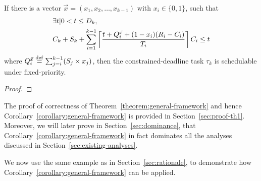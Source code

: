  \begin{Corollary}
   \label{corollary:general-framework}
   If there is a vector $\vec{x} = (x_1, x_2, \ldots,
   x_{k-1})$ with $x_i \in \{ 0, 1\}$, such that 
   {\small \begin{align} 
   \label{eq:TDA-suspension-tighter} 
       & \exists t | 0 < t \leq D_k,  \nonumber \\
       & C_k + S_k + \sum_{i=1}^{k-1}\ceiling{\frac{t+Q_i^{\vec{x}}+(1-x_i)(R_i-C_i)}{T_i}} C_i \leq t
     \end{align}}
     where $Q_i^{\vec{x}} \stackrel{\mathrm{def}}{=} \sum_{j=i}^{k-1} (S_j \times x_j)$, then the constrained-deadline task $\tau_k$ is schedulable under fixed-priority.
 \end{Corollary}
 \begin{proof}
 \end{proof}
 
  The proof of correctness of Theorem~\ref{theorem:general-framework} and hence Corollary~\ref{corollary:general-framework} is provided in Section~\ref{sec:proof-th1}. Moreover, we will later prove in Section~\ref{sec:dominance}, that Corollary~\ref{corollary:general-framework} in fact dominates all the analyses discussed in Section~\ref{sec:existing-analyses}.
 
 We now use the same example as in Section~\ref{sec:rationale}, to demonstrate how
Corollary~\ref{corollary:general-framework} can be applied.
 
